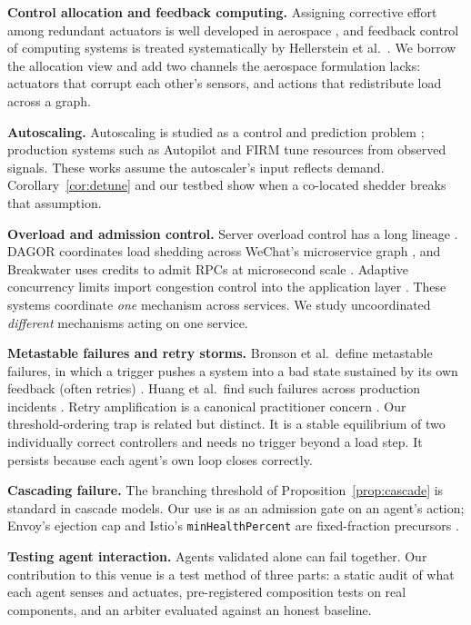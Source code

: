 \documentclass[conference]{IEEEtran}
\begin{document}
\textbf{Control allocation and feedback computing.} Assigning corrective
effort among redundant actuators is well developed in aerospace
\cite{durham1993,johansen2013}, and feedback control of computing systems is
treated systematically by Hellerstein et al.\ \cite{hellerstein2004}. We borrow
the allocation view and add two channels the aerospace formulation lacks:
actuators that corrupt each other's sensors, and actions that redistribute
load across a graph.

\textbf{Autoscaling.} Autoscaling is studied as a control and prediction
problem \cite{lorido2014}; production systems such as Autopilot
\cite{autopilot2020} and FIRM \cite{firm2020} tune resources from observed
signals. These works assume the autoscaler's input reflects demand.
Corollary~\ref{cor:detune} and our testbed show when a co-located shedder
breaks that assumption.

\textbf{Overload and admission control.} Server overload control has a long
lineage \cite{welsh2003}. DAGOR coordinates load shedding across WeChat's
microservice graph \cite{dagor2018}, and Breakwater uses credits to admit
RPCs at microsecond scale \cite{breakwater2020}. Adaptive concurrency limits
import congestion control into the application layer \cite{netflixlimits}.
These systems coordinate \emph{one} mechanism across services. We study
uncoordinated \emph{different} mechanisms acting on one service.

\textbf{Metastable failures and retry storms.} Bronson et al.\ define
metastable failures, in which a trigger pushes a system into a bad state
sustained by its own feedback (often retries) \cite{bronson2021}. Huang et
al.\ find such failures across production incidents \cite{huang2022}. Retry
amplification is a canonical practitioner concern
\cite{sre2016,buildersretry}. Our threshold-ordering trap is related but
distinct. It is a stable equilibrium of two individually correct controllers
and needs no trigger beyond a load step. It persists because each agent's
own loop closes correctly.

\textbf{Cascading failure.} The branching threshold of
Proposition~\ref{prop:cascade} is standard in cascade models. Our use is as an
admission gate on an agent's action; Envoy's ejection cap and Istio's
\texttt{minHealthPercent} are fixed-fraction precursors
\cite{envoyoutlier,istiodr}.

\textbf{Testing agent interaction.} Agents validated alone can fail together.
Our contribution to this venue is a test method of three parts: a static
audit of what each agent senses and actuates, pre-registered composition tests
on real components, and an arbiter evaluated against an honest baseline.
\end{document}
